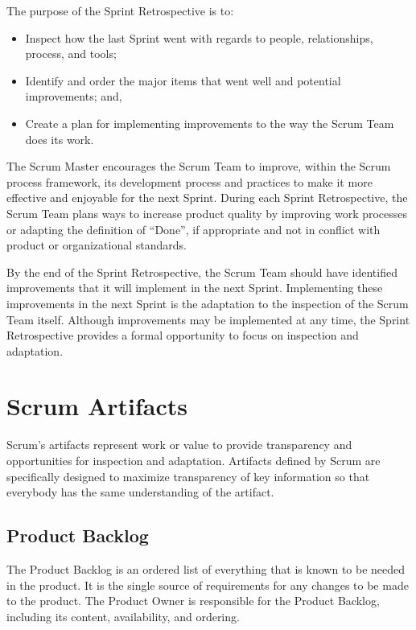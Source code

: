 The purpose of the Sprint Retrospective is to:
\begin{itemize}
\item Inspect how the last Sprint went with regards to people, relationships, process, and tools;
\item Identify and order the major items that went well and potential improvements; and,
\item Create a plan for implementing improvements to the way the Scrum Team does its work.
\end{itemize}
The Scrum Master encourages the Scrum Team to improve, within the Scrum process
framework, its development process and practices to make it more effective and enjoyable for
the next Sprint. During each Sprint Retrospective, the Scrum Team plans ways to increase
product quality by improving work processes or adapting the definition of ``Done'', if appropriate
and not in conflict with product or organizational standards.

By the end of the Sprint Retrospective, the Scrum Team should have identified improvements
that it will implement in the next Sprint. Implementing these improvements in the next Sprint is
the adaptation to the inspection of the Scrum Team itself. Although improvements may be
implemented at any time, the Sprint Retrospective provides a formal opportunity to focus on
inspection and adaptation.

\section{Scrum Artifacts}
Scrum's artifacts represent work or value to provide transparency and opportunities for
inspection and adaptation. Artifacts defined by Scrum are specifically designed to maximize
transparency of key information so that everybody has the same understanding of the artifact.

\subsection{Product Backlog}
The Product Backlog is an ordered list of everything that is known to be needed in the product.
It is the single source of requirements for any changes to be made to the product. The Product
Owner is responsible for the Product Backlog, including its content, availability, and ordering.

